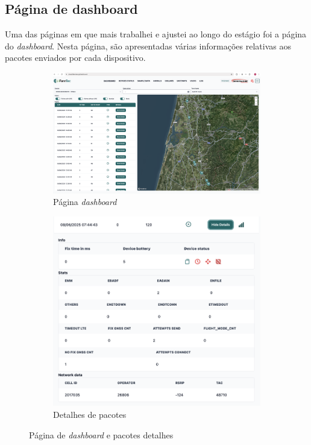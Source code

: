 \subsection{Página de dashboard} %
Uma das páginas em que mais trabalhei e ajustei ao longo do estágio foi a página do \textit{dashboard}. Nesta página, são apresentadas várias informações relativas aos pacotes enviados por cada dispositivo.


\begin{figure}[!h]
	\centering
	\begin{subfigure}[c]{0.55\textwidth}
        \centering
        \includegraphics[width=\textwidth]{figs/dashboard.png}
        \caption{Página \textit{dashboard}}
        \label{fig:dashboard}
	\end{subfigure}
	\hfill
	\begin{subfigure}[c]{0.40\textwidth}
        \centering
        \includegraphics[width=\textwidth]{figs/dashboard-details.png}
        \caption{Detalhes de pacotes}
        \label{fig:packet-details}
	\end{subfigure}
	\caption{Página de \textit{dashboard} e pacotes detalhes}
    \label{fig:dashboard-page}
\end{figure}

